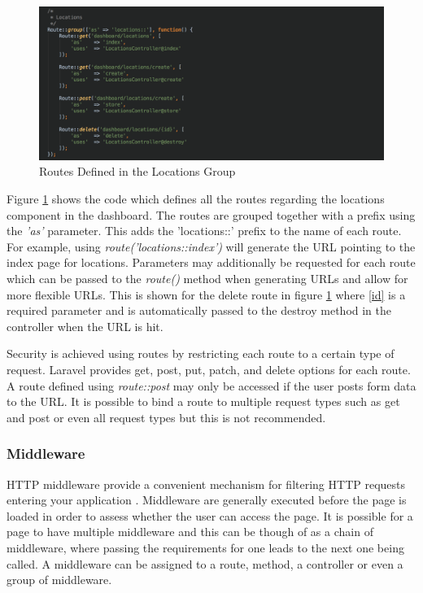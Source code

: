 \begin{figure}[H]
	\centering
	\includegraphics[width=1.0\textwidth]{images/Code/Routes}
	\caption{Routes Defined in the Locations Group} \label{fig:Routes}
\end{figure}

Figure \ref{fig:Routes} shows the code which defines all the routes regarding the locations component in the dashboard. The routes are grouped together with a prefix using the \emph{'as'} parameter. This adds the 'locations::' prefix to the name of each route. For example, using \emph{route('locations::index')} will generate the URL pointing to the index page for locations. Parameters may additionally be requested for each route which can be passed to the \emph{route()} method when generating URLs and allow for more flexible URLs. This is shown for the delete route in figure \ref{fig:Routes} where \ref{id} is a required parameter and is automatically passed to the destroy method in the controller when the URL is hit.

Security is achieved using routes by restricting each route to a certain type of request. Laravel provides get, post, put, patch, and delete options for each route. A route defined using \emph{route::post} may only be accessed if the user posts form data to the URL. It is possible to bind a route to multiple request types such as get and post or even all request types but this is not recommended.

\subsubsection{Middleware}
HTTP middleware provide a convenient mechanism for filtering HTTP requests entering your application \cite{Laravel:Middleware}. Middleware are generally executed before the page is loaded in order to assess whether the user can access the page. It is possible for a page to have multiple middleware and this can be though of as a chain of middleware, where passing the requirements for one leads to the next one being called. A middleware can be assigned to a route, method, a controller or even a group of middleware.

